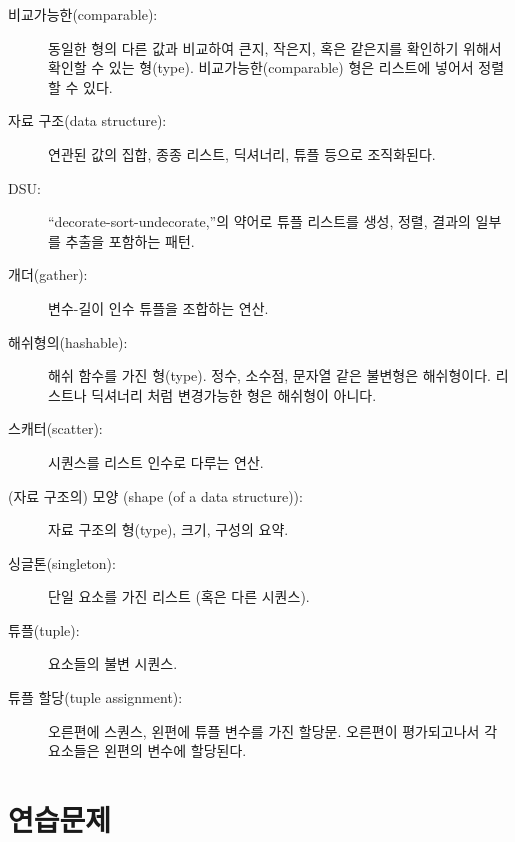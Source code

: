 \begin{description}

\item[비교가능한(comparable):] 동일한 형의 다른 값과 비교하여 큰지, 작은지, 혹은 같은지를 확인하기 위해서 확인할 수 있는 형(type).
비교가능한(comparable) 형은 리스트에 넣어서 정렬할 수 있다.

\item[자료 구조(data structure):] 연관된 값의 집합, 종종 리스트, 딕셔너리, 튜플 등으로 조직화된다.

\item[DSU:] ``decorate-sort-undecorate,''의 약어로 튜플 리스트를 생성, 정렬, 결과의 일부를 추출을 포함하는 패턴.

\item[개더(gather):] 변수-길이 인수 튜플을 조합하는 연산.

\item[해쉬형의(hashable):] 해쉬 함수를 가진 형(type). 정수, 소수점, 문자열 같은 불변형은 해쉬형이다. 
리스트나 딕셔너리 처럼 변경가능한 형은 해쉬형이 아니다.

\item[스캐터(scatter):] 시퀀스를 리스트 인수로 다루는 연산.

\item[(자료 구조의) 모양 (shape (of a data structure)):] 자료 구조의 형(type), 크기, 구성의 요약.

\item[싱글톤(singleton):] 단일 요소를 가진 리스트 (혹은 다른 시퀀스).

\item[튜플(tuple):] 요소들의 불변 시퀀스.

\item[튜플 할당(tuple assignment):] 오른편에 스퀀스, 왼편에 튜플 변수를 가진 할당문.
오른편이 평가되고나서 각 요소들은 왼편의 변수에 할당된다.

\end{description}


\section{연습문제}

